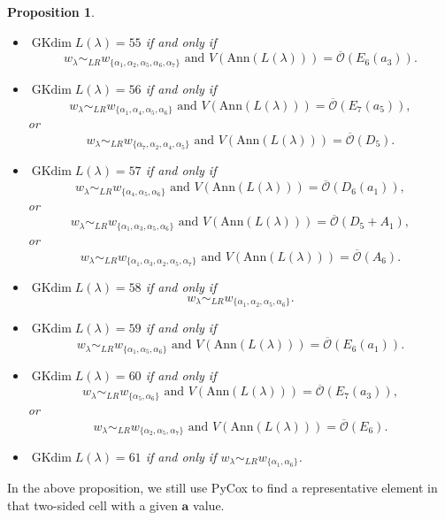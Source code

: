 \documentclass[reqno,12pt]{amsart}
\numberwithin{equation}{section}
\theoremstyle{plain}
\newtheorem{Prop}[Thm]{Proposition}
\theoremstyle{definition}
\newcommand{\lam}{\lambda}
\newcommand{\Ann}{\mathrm{Ann}}
\newcommand{\aff}{ \mathbf{a} }
\newcommand{\gkd}{\operatorname{GKdim}}
\begin{document}
\begin{Prop}
\begin{itemize}
    \item[(20)] $\gkd L(\lambda)=55$ if and only if $$w_{\lambda}\sim_{LR}w_{\{\alpha_1,\alpha_2,\alpha_5,\alpha_6,\alpha_7\}}\text{~and~} V(\Ann (L(\lam)))=\overline{\mathcal{O}}({E}_6(a_3)).$$ 
      
        \item[(21)] $\gkd L(\lambda)=56$ if and only if $$w_{\lambda}\sim_{LR}w_{\{\alpha_1,\alpha_4,\alpha_5,\alpha_6\}}\text{~and~} V(\Ann (L(\lam)))=\overline{\mathcal{O}}({E}_7(a_5)),$$
        or
$$w_{\lambda}\sim_{LR}w_{\{\alpha_7,\alpha_2,\alpha_4,\alpha_5\}}\text{~and~} V(\Ann (L(\lam)))=\overline{\mathcal{O}}({D}_5).$$
        \item[(22)] $\gkd L(\lambda)=57$ if and only if $$w_{\lambda}\sim_{LR}w_{\{\alpha_4,\alpha_5,\alpha_6\}} \text{~and~} V(\Ann (L(\lam)))=\overline{\mathcal{O}}({D}_6(a_1)),$$ or $$w_{\lambda}\sim_{LR}w_{\{\alpha_1,\alpha_3,\alpha_5,\alpha_6\}} \text{~and~} V(\Ann (L(\lam)))=\overline{\mathcal{O}}({D}_5+A_1),$$ or 
$$w_{\lambda}\sim_{LR}w_{\{\alpha_1,\alpha_3,\alpha_2,\alpha_5,\alpha_7\}} \text{~and~} V(\Ann (L(\lam)))=\overline{\mathcal{O}}(A_6).$$
        \item[(23)] $\gkd L(\lambda)=58$ if and only if $$w_{\lambda}\sim_{LR}w_{\{\alpha_1,\alpha_2,\alpha_5,\alpha_6\}}.$$
        \item[(24)] $\gkd L(\lambda)=59$ if and only if $$w_{\lambda}\sim_{LR}w_{\{\alpha_1,\alpha_5,\alpha_6\}} \text{~and~} V(\Ann (L(\lam)))=\overline{\mathcal{O}}({E}_6(a_1)).$$
        \item[(25)] $\gkd L(\lambda)=60$ if and only if $$w_{\lambda}\sim_{LR}w_{\{\alpha_5,\alpha_6\}} \text{~and~} V(\Ann (L(\lam)))=\overline{\mathcal{O}}({E}_7(a_3)),$$ or 
$$w_{\lambda}\sim_{LR}w_{\{\alpha_2,\alpha_5,\alpha_7\}}  \text{~and~} V(\Ann (L(\lam)))=\overline{\mathcal{O}}({E}_6).$$
        \item[(26)] $\gkd L(\lambda)=61$ if and only if $w_{\lambda}\sim_{LR}w_{\{\alpha_1,\alpha_6\}}$.
    \end{itemize}
\end{Prop}





In the above proposition, we still use PyCox to find a representative element in that two-sided cell with  a given $\aff$ value.
\end{document}
